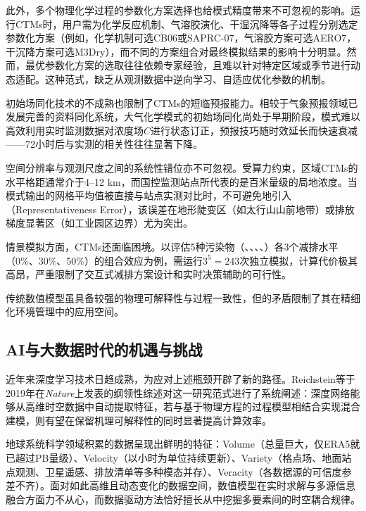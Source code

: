 此外，多个物理化学过程的参数化方案选择也给模式精度带来不可忽视的影响。运行CTMs时，用户需为化学反应机制、气溶胶演化、干湿沉降等各子过程分别选定参数化方案（例如，化学机制可选CB06或SAPRC-07，气溶胶方案可选AERO7，干沉降方案可选M3Dry），而不同的方案组合对最终模拟结果的影响十分明显\citep{appel2021community}。然而，最优参数化方案的选取往往依赖专家经验，且难以针对特定区域或季节进行动态适配。这种范式，缺乏从观测数据中逆向学习、自适应优化参数的机制。

初始场同化技术的不成熟也限制了CTMs的短临预报能力。相较于气象预报领域已发展完善的资料同化系统，大气化学模式的初始场同化尚处于早期阶段，模式难以高效利用实时监测数据对浓度场$C$进行状态订正，预报技巧随时效延长而快速衰减——72小时后与实测的相关性往往显著下降\citep{sun2021improvement}。

空间分辨率与观测尺度之间的系统性错位亦不可忽视。受算力约束，区域CTMs的水平格距通常介于4--12 km，而国控监测站点所代表的是百米量级的局地浓度。当模式输出的网格平均值被直接与站点实测对比时，不可避免地引入（Representativeness Error），该误差在地形陡变区（如太行山山前地带）或排放梯度显著区（如工业园区边界）尤为突出。

情景模拟方面，CTMs还面临困境。以评估5种污染物（\SOtwo、\NOx、\VOCs、\Ammonia、\PM）各3个减排水平（0\%、30\%、50\%）的组合效应为例，需运行$3^5=243$次独立模拟，计算代价极其高昂，严重限制了交互式减排方案设计和实时决策辅助的可行性。

传统数值模型虽具备较强的物理可解释性与过程一致性，但的矛盾限制了其在精细化环境管理中的应用空间。

\subsection{AI与大数据时代的机遇与挑战}
\label{subsec:ai_opportunity}

近年来深度学习技术日趋成熟，为应对上述瓶颈开辟了新的路径。Reichstein等于2019年在\textit{Nature}上发表的纲领性综述\citep{reichstein2019deep}对这一研究范式进行了系统阐述：深度网络能够从高维时空数据中自动提取特征，若与基于物理方程的过程模型相结合实现混合建模，则有望在保留机理可解释性的同时显著提高计算效率。

地球系统科学领域积累的数据呈现出鲜明的特征\citep{reichstein2019deep}：Volume（总量巨大，仅ERA5就已超过PB量级）、Velocity（以小时为单位持续更新）、Variety（格点场、地面站点观测、卫星遥感、排放清单等多种模态并存）、Veracity（各数据源的可信度参差不齐）。面对如此高维且动态变化的数据空间，数值模型在实时求解与多源信息融合方面力不从心，而数据驱动方法恰好擅长从中挖掘多要素间的时空耦合规律。

